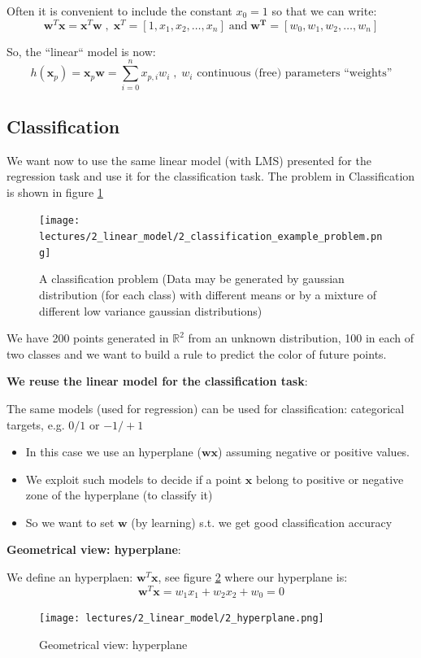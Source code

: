 \documentclass[../main.tex]{subfiles}
\begin{document}
Often it is convenient to include the constant $x_0 = 1$ so that we can write:
$$ \mathbf{w}^T\mathbf{x} = \mathbf{x}^T\mathbf{w} \;,\; \mathbf{x}^T = [1, x_1, x_2, \dots, x_n] \;\text{and}\; \mathbf{w^T} = [w_0, w_1, w_2, \dots, w_n]$$

So, the “linear“ model is now: 
$$ h(\mathbf{x}_p) = \mathbf{x}_p\mathbf{w} = \sum_{i = 0}^{n} x_{p,i}w_i \;, \; \text{$w_i$ continuous (free) parameters “weights”}$$

\subsection{Classification}
We want now to use the same linear model (with LMS) presented for the regression task and use it for the classification task. The problem in Classification is shown in figure \ref{fig:2_classification_example_problem}

\begin{figure}[H]
    \centering
    \texttt{[image: lectures/2\_linear\_model/2\_classification\_example\_problem.png]}
    \caption{A classification problem (Data may be generated by gaussian distribution (for each class) with different means
or by a mixture of different low variance gaussian distributions)}
    \label{fig:2_classification_example_problem}
\end{figure}
We have 200 points generated in $\mathbb{R}^2$ from an unknown distribution, 100 in each of
two classes and we want to build a rule to predict the color of future points.

\noindent \textbf{We reuse the linear model for the classification task}:

The same models (used for regression) can be used for classification: categorical targets, e.g. $0/1$ or $-1/+1$

\begin{itemize}
    \item In this case we use an hyperplane ($\mathbf{wx}$) assuming negative or positive values.
    \item We exploit such models to decide if a point $\mathbf{x}$ belong to positive or negative zone of the hyperplane (to classify it)
    \item So we want to set $\mathbf{w}$ (by learning) s.t. we get good classification accuracy
\end{itemize}

\noindent \textbf{Geometrical view: hyperplane}:

We define an hyperplaen: $\mathbf{w}^T\mathbf{x}$, see figure \ref{fig:2_hyperplane} where our hyperplane is:
$$ \mathbf{w}^T\mathbf{x} = w_1x_1 + w_2x_2 +w_0 = 0$$
\begin{figure}[ht]
    \centering
    \texttt{[image: lectures/2\_linear\_model/2\_hyperplane.png]}
    \caption{Geometrical view: hyperplane}
    \label{fig:2_hyperplane}
\end{figure}
\end{document}
